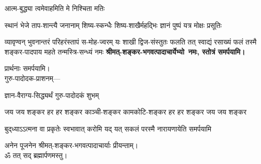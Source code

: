 \begin{center}
{आत्म-बुद्ध्या त्वमेवाहमिति मे निश्चिता मतिः}

{स्थानं भेजे ताप-शान्त्यै जनानाम्}
{शिष्य-स्कन्धैः शिष्य-शाखैर्महद्भिः}
{ज्ञानं पुष्पं यत्र मोक्षः प्रसूतिः}

{व्यावृण्वन् भुवनान्तरं परिहरंस्तापं स-मोह-ज्वरम्}
{यः शाखी द्विज-संस्तुतः फलति तत् स्वाद्यं रसाख्यं फलं}
{तस्मै शङ्कर-पादपाय महते तन्मस्त्रि-सन्ध्यं नमः}
\textbf{श्रीमत्-शङ्कर-भगवत्पादाचार्येभ्यो~नमः, स्तोत्रं समर्पयामि।}
\medskip

प्रार्थनाः समर्पयामि।\\

{गुरु-पादोदक-प्राशनम्\textsf{—}\hfill}

{ज्ञान-वैराग्य-सिद्ध्यर्थं गुरु-पादोदकं शुभम्}

\closesection







{जय जय शङ्कर हर हर शङ्कर}
{काञ्ची-शङ्कर कामकोटि-शङ्कर}
{हर हर शङ्कर जय जय शङ्कर}

{बुद्‌ध्याऽऽत्मना वा प्रकृतेः स्वभावात्}
{करोमि यद् यत् सकलं परस्मै}
{नारायणायेति समर्पयामि}

अनेन पूजनेन श्रीमत्-शङ्कर-भगवत्पादाचार्याः प्रीयन्ताम्।\\

ॐ तत् सद् ब्रह्मार्पणमस्तु।

\closesection


\end{center}
\closesection
